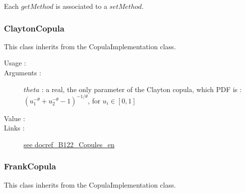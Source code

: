Each  $getMethod$  is associated to a $setMethod$.

\newpage \subsubsection{ClaytonCopula}

This class inherits from the CopulaImplementation class.

\begin{description}

\item[Usage :] \rule{0pt}{1em}


\item[Arguments :]  $theta$     : a real, the only parameter of the Clayton copula, which PDF is : $\displaystyle \left(u_1^{-\theta}+u_2^{-\theta}-1\right)^{-1/\theta}$, for $u_i \in [0,1]$

\item[Value :]  \rule{0pt}{1em}

\item[Links :]
  \href{./Version/docref_B122_Copules_en.pdf}{see docref\_B122\_Copules\_en}
\end{description}

\newpage \subsubsection{FrankCopula}

This class inherits from the CopulaImplementation class.

